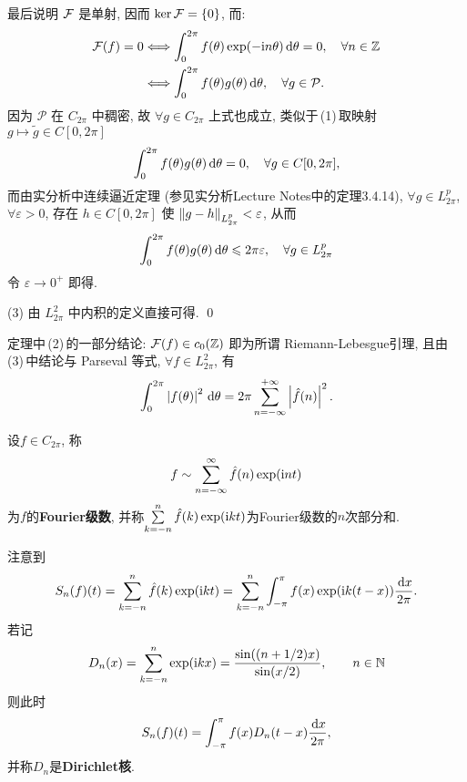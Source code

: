 \begin{Proof}
	最后说明 $ \mathcal{F} $ 是单射, 因而 $ \ker \mathcal{F}=\{ 0 \} $, 而:
	\[
		\begin{aligned}
			\mathcal{F}(f)=0 & \Longleftrightarrow \int_{0}^{2\pi}f(\theta)\exp(-\mathrm{i} n\theta)\,\mathrm{d}\theta=0, \quad\forall n\in\mathbb{Z} \\
			         & \Longleftrightarrow\int_{0}^{2\pi}f(\theta)g(\theta)\,\mathrm{d}\theta, \quad \forall g\in\mathcal{P}.
		\end{aligned}
	\]
	因为 $ \mathcal{P} $ 在 $ C_{2\pi} $ 中稠密, 故 $ \forall g\in C_{2\pi} $ 上式也成立, 类似于\,(1)\,取映射 $ g\mapsto\tilde{g}\in C[0, 2\pi] $
	\[
		\int_{0}^{2\pi}f(\theta)g(\theta)\,\mathrm{d}\theta=0, \quad \forall g\in C[0, 2\pi],
	\]
	而由实分析中连续逼近定理 (参见实分析Lecture Notes中的定理3.4.14), $ \forall g\in L_{2\pi}^{p} $, $ \forall\varepsilon>0 $, 存在 $ h\in C[0, 2\pi] $ 使 $ \left\| g-h \right\|_{L_{2\pi}^{p}}<\varepsilon $, 从而
	\[
		\int_{0}^{2\pi}f(\theta)g(\theta)\,\mathrm{d}\theta\leqslant 2\pi\varepsilon, \quad \forall g\in L_{2\pi}^{p}
	\]
	令 $ \varepsilon\to 0^{+} $ 即得.

	(3) 由 $ L_{2\pi}^{2} $ 中内积的定义直接可得. \qed
\end{Proof}

\begin{Remark}
	定理中\,(2)\,的一部分结论: $ \mathcal{F}(f)\in c_{0}(\mathbb{Z}) $ 即为所谓 Riemann-Lebesgue引理, 且由\,(3)\,中结论与 Parseval 等式, $\forall f\in L_{2\pi}^{2}$, 有
	\[
		\int_{0}^{2\pi}\left| f(\theta) \right| ^{2}\,\mathrm{d}\theta=2\pi\sum_{n=-\infty}^{+\infty}\left| \hat{f}(n) \right| ^{2}.
	\]
\end{Remark}

\begin{Definition}[Fourier级数]
	设$ f\in C_{2\pi} $, 称
	\[
		f\sim\sum_{n=-\infty}^{\infty}\hat{f}(n)\exp(\mathrm{i} nt)
	\]
	为$ f $的\textbf{Fourier级数}, 并称$ \sum\limits_{k=-n}^n\hat{f}(k)\exp(\mathrm{i} kt) $为Fourier级数的$ n $次部分和.
\end{Definition}

注意到
\[
	S_n(f)(t)=\sum_{k=-n}^n\hat{f}(k)\exp(\mathrm{i} kt)=\sum_{k=-n}^n\int_{-\pi}^\pi f(x)\exp(\mathrm{i} k(t-x))\frac{\,\mathrm{d} x}{2\pi}.
\]
若记
\[
	D_n(x)=\sum_{k=-n}^n\exp(\mathrm{i} kx)=\frac{\sin((n+1/2)x)}{\sin (x/2)},\qquad n\in\mathbb{N}
\]
则此时
\[
	S_n(f)(t)=\int_{-\pi}^\pi f(x)D_n(t-x)\frac{\,\mathrm{d} x}{2\pi},
\]
并称$ D_n $是\textbf{Dirichlet核}.

